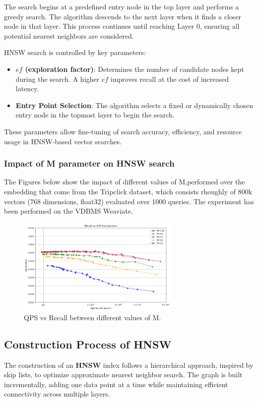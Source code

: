 The search begins at a predefined entry node in the top layer and performs a greedy search. The algorithm descends to the next layer when it finds a closer node in that layer. This process continues until reaching Layer 0, ensuring all potential nearest neighbors are considered.  

HNSW search is controlled by key parameters:  
\begin{itemize}  
    \item \textbf{$ef$ (exploration factor)}: Determines the number of candidate nodes kept during the search. A higher $ef$ improves recall at the cost of increased latency. 
    \item \textbf{Entry Point Selection}: The algorithm selects a fixed or dynamically chosen entry node in the topmost layer to begin the search.  
\end{itemize}  

These parameters allow fine-tuning of search accuracy, efficiency, and resource usage in HNSW-based vector searches.  
\subsubsection{Impact of M parameter on HNSW search}
The Figures below show the impact of different values of M,performed over the embedding that come from the Tripclick dataset, which consists rhoughly of 800k vectors (768 dimensions, float32) evaluated over 1000 queries. The experiment has been performed on the VDBMS Weaviate.
\begin{figure}[h]
    \centering
\includegraphics[width=0.7\textwidth]{IMAGES/immagine_2025-02-27_142057404.png}
    \caption{QPS vs Recall between different values of M.}
    \label{fig:M search}
\end{figure}

\subsection{Construction Process of HNSW}
The construction of an \textbf{HNSW} index follows a hierarchical approach, inspired by skip lists, to optimize approximate nearest neighbor search. The graph is built incrementally, adding one data point at a time while maintaining efficient connectivity across multiple layers.
